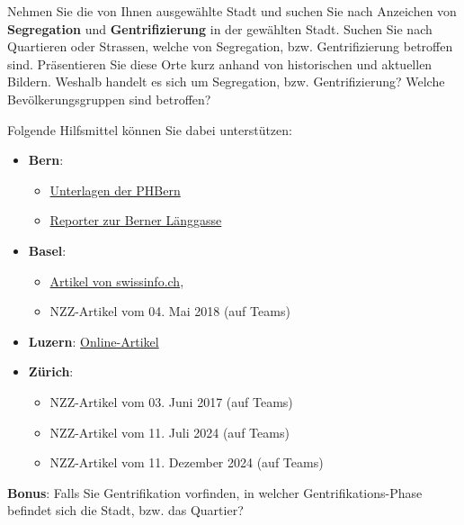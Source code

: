 \begin{myexercise}
Nehmen Sie die von Ihnen ausgewählte Stadt und suchen Sie nach Anzeichen von \textbf{Segregation} und \textbf{Gentrifizierung} in der gewählten Stadt. Suchen Sie nach Quartieren oder Strassen, welche von Segregation, bzw. Gentrifizierung betroffen sind. Präsentieren Sie diese Orte kurz anhand von historischen und aktuellen Bildern. Weshalb handelt es sich um Segregation, bzw. Gentrifizierung? Welche Bevölkerungsgruppen sind betroffen?

Folgende Hilfsmittel können Sie dabei unterstützen:
\begin{itemize}
\item \textbf{Bern}:
\begin{itemize}
\item \href{https://www.phbern.ch/dienstleistungen/unterrichtsmedien/ideenset-stadtgeographie-und-raumplanung/gentrifizierung}{Unterlagen der PHBern}
\item \href{https://www.srf.ch/news/schweiz/schicke-stadtquartiere-das-ist-keine-soziale-politik}{Reporter zur Berner Länggasse}
\end{itemize} 
\item \textbf{Basel}: 
\begin{itemize}
\item \href{https://www.swissinfo.ch/ger/gesellschaft/gentrifizierung_aus-den-staedten-vertrieben/43666530}{Artikel von swissinfo.ch}, \item NZZ-Artikel vom 04. Mai 2018 (auf Teams)
\end{itemize}
\item \textbf{Luzern}: \href{https://kultz.ch/a/clel3pddz1349817542ybcu2zkkq/kultz-luzern-droht-der-baselstrasse-die-gentrifizierung}{Online-Artikel}
\item \textbf{Zürich}: 
\begin{itemize}
\item NZZ-Artikel vom 03. Juni 2017 (auf Teams)
\item NZZ-Artikel vom  11. Juli 2024 (auf Teams)
\item NZZ-Artikel vom  11. Dezember 2024 (auf Teams)
\end{itemize}
\end{itemize}
\textbf{Bonus}: Falls Sie Gentrifikation vorfinden, in welcher Gentrifikations-Phase befindet sich die Stadt, bzw. das Quartier?
\end{myexercise}

